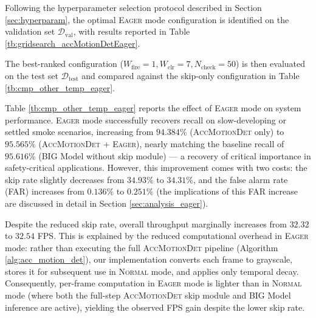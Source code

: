 \documentclass[
  10pt,
]{article}
\begin{document}
Following the hyperparameter selection protocol described in Section
\ref{sec:hyperparam}, the optimal \textsc{Eager} mode configuration is
identified on the validation set \(\mathcal{D}_{\mathrm{val}}\), with
results reported in Table \ref{tb:gridsearch_accMotionDetEager}.

The best-ranked configuration
(\(W_{\text{fire}} = 1, W_{\text{clr}} = 7, N_{\text{check}} = 50\)) is
then evaluated on the test set \(\mathcal{D}_{\text{test}}\) and
compared against the skip-only configuration in Table
\ref{tb:cmp_other_temp_eager}.

\begin{table}[htbp]
    \caption{Comparison of Frame-level performance metrics, measuring the delay and initial detection speed. The best and second-best results for each metric are highlighted in \textbf{bold} and \textit{\underline{italic underline}}, respectively.}
    \label{tb:cmp_other_temp_eager}
\end{table}

Table \ref{tb:cmp_other_temp_eager} reports the effect of \textsc{Eager}
mode on system performance. \textsc{Eager} mode successfully recovers
recall on slow-developing or settled smoke scenarios, increasing from
\(94.384\%\) (\textsc{AccMotionDet} only) to \(95.565\%\)
(\textsc{AccMotionDet} + \textsc{Eager}), nearly matching the baseline
recall of \(95.616\%\) (BIG Model without skip module) --- a recovery of
critical importance in safety-critical applications. However, this
improvement comes with two costs: the skip rate slightly decreases from
\(34.93\%\) to \(34.31\%\), and the false alarm rate (FAR) increases
from \(0.136\%\) to \(0.251\%\) (the implications of this FAR increase
are discussed in detail in Section \ref{sec:analysis_eager}).

Despite the reduced skip rate, overall throughput marginally increases
from \(32.32\) to \(32.54\) FPS. This is explained by the reduced
computational overhead in \textsc{Eager} mode: rather than executing the
full \textsc{AccMotionDet} pipeline (Algorithm
\ref{alg:acc_motion_det}), our implementation converts each frame to
grayscale, stores it for subsequent use in \textsc{Normal} mode, and
applies only temporal decay. Consequently, per-frame computation in
\textsc{Eager} mode is lighter than in \textsc{Normal} mode (where both
the full-step \textsc{AccMotionDet} skip module and BIG Model inference
are active), yielding the observed FPS gain despite the lower skip rate.
\end{document}
